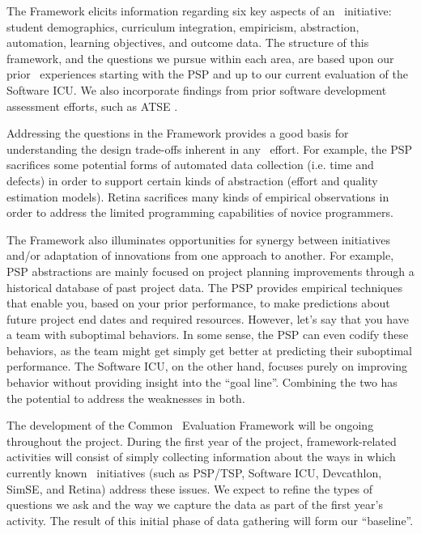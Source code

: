The Framework elicits information regarding six key aspects of an \eCT\
initiative: student demographics, curriculum integration, empiricism,
abstraction, automation, learning objectives, and outcome data.  The
structure of this framework, and the questions we pursue within each area,
are based upon our prior \eCT\ experiences starting with the PSP and up to
our current evaluation of the Software ICU. We also incorporate findings from
prior software development assessment efforts, such as ATSE \citep{Klappholz03}.

Addressing the questions in the Framework provides a good basis for
understanding the design trade-offs inherent in any \eCT\ effort.  For
example, the PSP sacrifices some potential forms of automated data
collection (i.e. time and defects) in order to support certain kinds of
abstraction (effort and quality estimation models).  Retina sacrifices many
kinds of empirical observations in order to address the limited programming
capabilities of novice programmers.

The Framework also illuminates opportunities for synergy between
initiatives and/or adaptation of innovations from one approach to another.
For example, PSP abstractions are mainly focused on project planning
improvements through a historical database of past project data. The PSP
provides empirical techniques that enable you, based on your prior
performance, to make predictions about future project end dates and
required resources.  However, let's say that you have a team with
suboptimal behaviors.  In some sense, the PSP can even codify these
behaviors, as the team might get simply get better at predicting their
suboptimal performance.  The Software ICU, on the other hand, focuses purely 
on improving behavior without providing insight into the ``goal line''.  
Combining the two has the potential to address the weaknesses in both. 

The development of the Common \eCT\ Evaluation Framework will be ongoing
throughout the project.  During the first year of the project,
framework-related activities will consist of simply collecting information
about the ways in which currently known \eCT\ initiatives (such as PSP/TSP,
Software ICU, Devcathlon, SimSE, and Retina) address these issues.   We expect to 
refine the types of questions we ask and the way we capture the data as
part of the first year's activity. The result of this initial phase of data
gathering will form our ``baseline''. 

